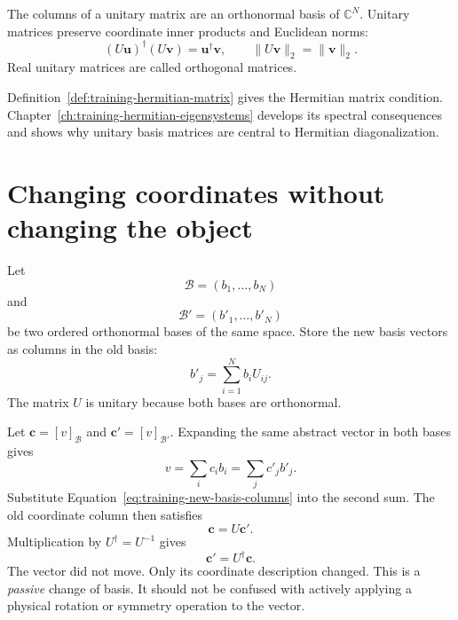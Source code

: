 The columns of a unitary matrix are an orthonormal basis of \(\mathbb C^N\).
Unitary matrices preserve coordinate inner products and Euclidean norms:
\begin{equation}
  (U\mathbf u)^{\dagger}(U\mathbf v)
  =\mathbf u^{\dagger}\mathbf v,
  \qquad
  \|U\mathbf v\|_2=\|\mathbf v\|_2.
\end{equation}
Real unitary matrices are called orthogonal matrices.

Definition~\ref{def:training-hermitian-matrix} gives the Hermitian matrix
condition. Chapter~\ref{ch:training-hermitian-eigensystems} develops its
spectral consequences and shows why unitary basis matrices are central to
Hermitian diagonalization.

\section{Changing coordinates without changing the object}

Let
\begin{equation}
  \mathcal B=(b_1,\ldots,b_N)
\end{equation}
and
\begin{equation}
  \mathcal B'=(b'_1,\ldots,b'_N)
\end{equation}
be two ordered orthonormal bases of the same space. Store the new basis vectors
as columns in the old basis:
\begin{equation}
  b'_j=\sum_{i=1}^{N}b_iU_{ij}.
  \label{eq:training-new-basis-columns}
\end{equation}
The matrix \(U\) is unitary because both bases are orthonormal.

Let \(\mathbf c=[v]_{\mathcal B}\) and
\(\mathbf c'=[v]_{\mathcal B'}\). Expanding the same abstract vector in both
bases gives
\begin{equation}
  v=\sum_i c_i b_i=\sum_j c'_j b'_j.
\end{equation}
Substitute Equation~\eqref{eq:training-new-basis-columns} into the second sum.
The old coordinate column then satisfies
\begin{equation}
  \mathbf c=U\mathbf c'.
\end{equation}
Multiplication by \(U^{\dagger}=U^{-1}\) gives
\begin{equation}
  \mathbf c'=U^{\dagger}\mathbf c.
  \label{eq:training-vector-coordinate-change}
\end{equation}
The vector did not move. Only its coordinate description changed. This is a
\emph{passive} change of basis. It should not be confused with actively applying
a physical rotation or symmetry operation to the vector.

